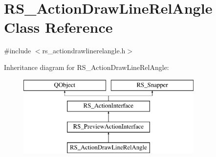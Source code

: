 \hypertarget{classRS__ActionDrawLineRelAngle}{\section{R\-S\-\_\-\-Action\-Draw\-Line\-Rel\-Angle Class Reference}
\label{classRS__ActionDrawLineRelAngle}
}


{\ttfamily \#include $<$rs\-\_\-actiondrawlinerelangle.\-h$>$}

Inheritance diagram for R\-S\-\_\-\-Action\-Draw\-Line\-Rel\-Angle\-:\begin{figure}[H]
\begin{center}
\leavevmode
\includegraphics[height=4.000000cm]{classRS__ActionDrawLineRelAngle}
\end{center}
\end{figure}
